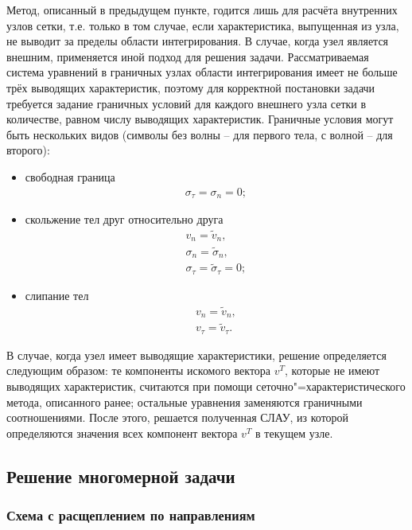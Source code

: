 Метод, описанный в предыдущем пункте, годится лишь для расчёта внутренних узлов
сетки, т.е. только в том случае, если характеристика, выпущенная из узла, не
выводит за пределы области интегрирования. В случае, когда узел является
внешним, применяется иной подход для решения задачи. Рассматриваемая система
уравнений в граничных узлах области интегрирования имеет не больше трёх
\cite{chelnokov} выводящих характеристик, поэтому для корректной постановки
задачи требуется задание граничных условий для каждого внешнего узла сетки в
количестве, равном числу выводящих характеристик. Граничные условия могут быть
нескольких видов (символы без волны -- для первого тела, с волной -- для второго):
\begin{itemize}
\item{свободная граница
\begin{eqnarray}
\sigma_\tau=\sigma_n=0; \nonumber
\end{eqnarray}}
\item{скольжение тел друг относительно друга 
\begin{eqnarray}
v_n=\tilde{v}_n,\nonumber\\
\sigma_n=\tilde{\sigma}_n,\nonumber\\
\sigma_\tau=\tilde{\sigma}_\tau=0; \nonumber
\end{eqnarray}}
\item{слипание тел
\begin{eqnarray}
v_n=\tilde{v}_n,\nonumber\\
v_\tau=\tilde{v}_\tau.
\end{eqnarray}}
\end{itemize}
В случае, когда узел имеет выводящие характеристики, решение определяется
следующим образом: те компоненты искомого вектора $v^T$, которые не имеют
выводящих характеристик, считаются при помощи сеточно"=характеристического
метода, описанного ранее; остальные уравнения заменяются граничными
соотношениями. После этого, решается полученная СЛАУ, из которой определяются
значения всех компонент вектора $v^T$ в текущем узле.

\clearpage
\newpage

\subsection{Решение многомерной задачи}

\subsubsection{Схема с расщеплением по направлениям}

